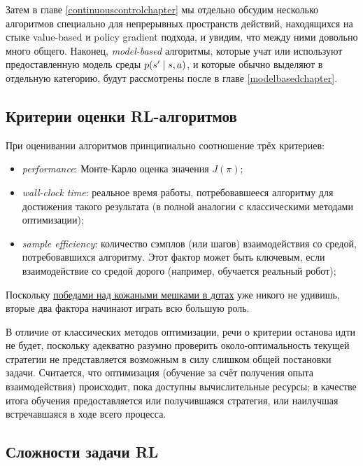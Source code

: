 Затем в главе \ref{continuouscontrolchapter} мы отдельно обсудим несколько алгоритмов специально для непрерывных пространств действий, находящихся на стыке value-based и policy gradient подхода, и увидим, что между ними довольно много общего. Наконец, \emph{model-based} алгоритмы, которые учат или используют предоставленную модель среды $p(s' \HM\mid s, a)$, и которые обычно выделяют в отдельную категорию, будут рассмотрены после в главе \ref{modelbasedchapter}.

\subsection{Критерии оценки RL-алгоритмов}

При оценивании алгоритмов принципиально соотношение трёх критериев:
\begin{itemize}
    \item \emph{performance}: Монте-Карло оценка значения $J(\pi)$;
    \item \emph{wall-clock time}: реальное время работы, потребовавшееся алгоритму для достижения такого результата (в полной аналогии с классическими методами оптимизации);
    \item \emph{sample efficiency}: количество сэмплов (или шагов) взаимодействия со средой, потребовавшихся алгоритму. Этот фактор может быть ключевым, если взаимодействие со средой дорого (например, обучается реальный робот); 
\end{itemize}

\begin{remark}Поскольку \href{https://openai.com/projects/five/}{победами над кожаными мешками в дотах} уже никого не удивишь, вторые два фактора начинают играть всю большую роль.
\end{remark}

В отличие от классических методов оптимизации, речи о критерии останова идти не будет, поскольку адекватно разумно проверить около-оптимальность текущей стратегии не представляется возможным в силу слишком общей постановки задачи. Считается, что оптимизация (обучение за счёт получения опыта взаимодействия) происходит, пока доступны вычислительные ресурсы; в качестве итога обучения предоставляется или получившаяся стратегия, или наилучшая встречавшаяся в ходе всего процесса.

\subsection{Сложности задачи RL}

